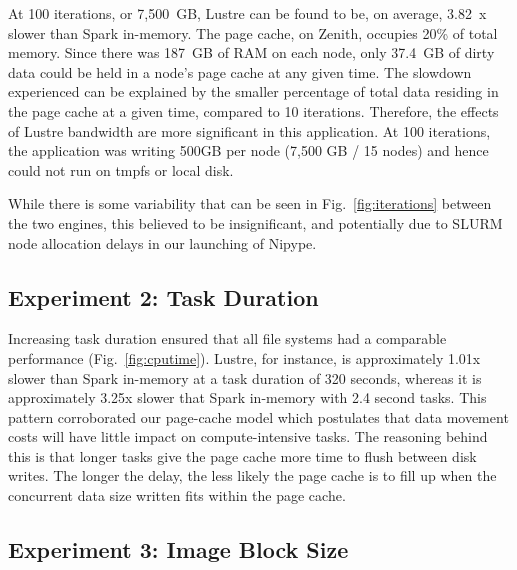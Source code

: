 \documentclass{IEEEtran}
\begin{document}


At 100 iterations, or 7,500~GB, Lustre can be found to be, on average, 3.82~x 
slower than Spark in-memory. The page cache, on Zenith, occupies 20\% of 
total memory. Since there was 187~GB of RAM on each node, only 37.4~GB of 
dirty data could be held in a node's page cache at any given time. The 
slowdown experienced can be explained by the smaller percentage of total data 
residing in the page cache at a given time, compared to 10 iterations. 
Therefore, the effects of Lustre bandwidth are more significant in 
this application. At 100 iterations, the application was writing 500GB 
per node (7,500 GB / 15 nodes) and hence could not run on tmpfs or local disk.

While there is some variability that can be seen in Fig.~\ref{fig:iterations} 
between the two engines, this believed to be insignificant, and potentially due 
to SLURM node allocation delays in our launching of Nipype.


\subsection{Experiment 2: Task Duration}
%


Increasing task duration ensured that all file systems had a comparable performance
(Fig.~\ref{fig:cputime}). Lustre, for instance, is approximately 1.01x slower
than Spark in-memory at a task duration of 320 seconds, whereas it is 
approximately 3.25x slower that Spark in-memory with 2.4 second tasks. This 
pattern corroborated our page-cache model which postulates that 
data movement costs will have little impact on compute-intensive tasks. The 
reasoning behind this is that longer tasks give the page cache more time to flush 
between disk writes. The longer the delay, the less likely the page cache is 
to fill up when the concurrent data size written fits within the page cache.

\subsection{Experiment 3: Image Block Size}
\end{document}
